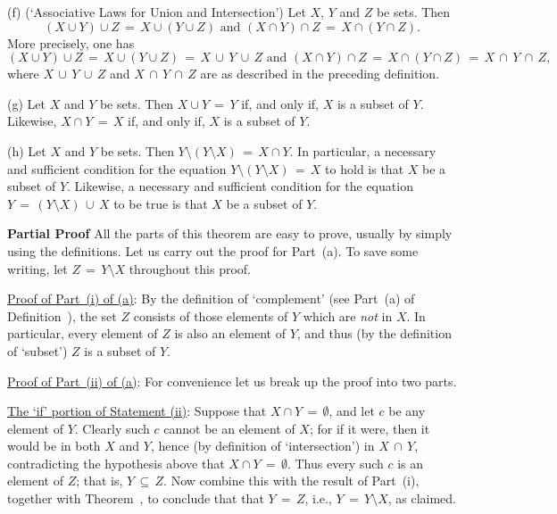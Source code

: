 \V

        (f) (`Associative Laws for Union and Intersection') Let $X$, $Y$ and $Z$ be sets.
    Then
        \begin{displaymath}
        (X{\cup}Y){\cup}Z \,=\, X{\cup}(Y{\cup}Z) \mbox{ and } (X{\cap}Y){\cap}Z \,=\, X{\cap}(Y{\cap}Z).
        \end{displaymath}
    More precisely, one has
        \begin{displaymath}
        (X{\cup}Y){\cup}Z \,=\, X{\cup}(Y{\cup}Z) \,=\, X\,{\cup}\,Y\,{\cup}\,Z \mbox{ and } (X{\cap}Y){\cap}Z \,=\, X{\cap}(Y{\cap}Z) \,=\, X\,{\cap}\,Y\,{\cap}\,Z,
        \end{displaymath}
    where $X\,{\cup}\,Y\,{\cup}\,Z$ and $X\,{\cap}\,Y\,{\cap}\,Z$ are as described in the preceding definition.

\V

        (g) Let $X$ and $Y$ be sets. Then $X{\cup}Y \,=\, Y$ if, and only if, $X$ is a subset of $Y$.
    Likewise, $X{\cap}Y \,=\, X$ if, and only if, $X$ is a subset of $Y$.

\V

        (h) Let $X$ and $Y$ be sets. Then $Y{\setminus}(Y{\setminus}X) \,=\, X{\cap}Y$.
    In particular, a necessary and sufficient condition for the equation $Y{\setminus}(Y{\setminus}X) \,=\, X$ to hold is that $X$ be a subset of $Y$.
    Likewise, a necessary and sufficient condition for the equation $Y \,=\, (Y{\setminus}X)\,{\cup}\,X$ to be true is that $X$ be a subset of $Y$.

\V
\V

        {\bf Partial Proof} All the parts of this theorem are easy to prove, usually by simply using the definitions.
    Let us carry out the proof for Part~(a). To save some writing, let $Z \,=\, Y{\setminus}X$ throughout this proof.

        \underline{Proof of Part~(i) of (a)}: By the definition of `complement' (see Part~(a) of Definition~),
    the set $Z$ consists of those elements of $Y$ which are {\em not} in $X$.
    In particular, every element of $Z$ is also an element of $Y$, and thus (by the definition of `subset') $Z$ is a subset of $Y$.

        \underline{Proof of Part~(ii) of (a)}: For convenience let us break up the proof into two parts.

        \underline{The `if' portion of Statement (ii)}: 
    Suppose that $X{\cap}Y \,=\, {\emptyset}$, and let $c$ be any element of $Y$.
    Clearly such $c$ cannot be an element of $X$; for if it were, then it would be in both $X$ and $Y$, hence (by definition of `intersection') in $X\,{\cap}\,Y$,
    contradicting the hypothesis above that $X{\cap}Y \,=\, {\emptyset}$.
    Thus every such $c$ is an element of $Z$; that is, $Y \,{\subseteq}\, Z$.
    Now combine this with the result of Part~(i), together with Theorem~,
    to conclude that that $Y \,=\, Z$, i.e., $Y \,=\, Y{\setminus}X$, as claimed.

